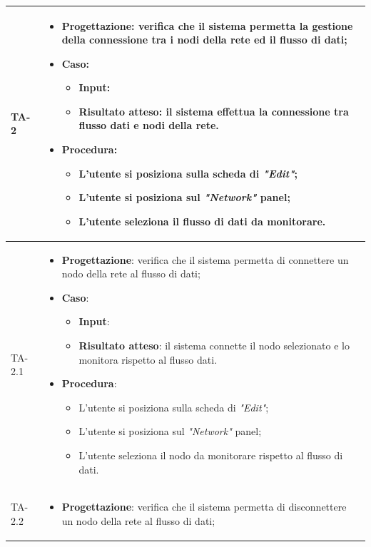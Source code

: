 \begin{longtable}{|C{2.5cm}|C{13cm}|}
{TA-2} &
\begin{itemize}
	\item \textbf{Progettazione}: verifica che il sistema permetta la gestione della connessione tra i nodi della rete ed il flusso di dati;
	\item \textbf{Caso}: 
	\begin{itemize}
		\item \textbf{Input}:
		\item \textbf{Risultato atteso}: il sistema effettua la connessione tra flusso dati e nodi della rete.
	\end{itemize}
	\item \textbf{Procedura}:
	\begin{itemize}
		\item L'utente si posiziona sulla scheda di \emph{"Edit"};
		\item L'utente si posiziona sul \emph{"Network"} panel;
		\item L'utente seleziona il flusso di dati da monitorare.
	\end{itemize} 
\end{itemize} \\
 \hline
{TA-2.1} &
\begin{itemize}
	\item \textbf{Progettazione}: verifica che il sistema permetta di connettere un nodo della rete al flusso di dati;
	\item \textbf{Caso}: 
	\begin{itemize}
		\item \textbf{Input}: 
		\item \textbf{Risultato atteso}: il sistema connette il nodo selezionato e lo monitora rispetto al flusso dati.
	\end{itemize}
	\item \textbf{Procedura}:
	\begin{itemize}
		\item L'utente si posiziona sulla scheda di \emph{"Edit"};
		\item L'utente si posiziona sul \emph{"Network"} panel;
		\item L'utente seleziona il nodo da monitorare rispetto al flusso di dati.
	\end{itemize} 
\end{itemize} \\
\hline
{TA-2.2} &
\begin{itemize}
	\item \textbf{Progettazione}: verifica che il sistema permetta di disconnettere un nodo della rete al flusso di dati;

\end{itemize}
\end{longtable}
